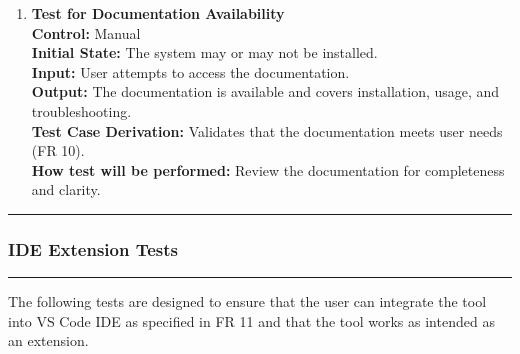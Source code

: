 \documentclass[12pt, titlepage]{article}
\newcommand{\colorrule}{\textcolor{BlueViolet}{\rule{\linewidth}{2pt}}}
\begin{document}
\begin{enumerate}[label={\bf
    \textcolor{Maroon}{test-FR-DA-\arabic*}}, wide=0pt, font=\itshape]
  \item \textbf{Test for Documentation Availability}\\[2mm]
    \textbf{Control:} Manual\\
    \textbf{Initial State:} The system may or may not be installed.\\
    \textbf{Input:} User attempts to access the documentation.\\
    \textbf{Output:} The documentation is available and covers
    installation, usage, and troubleshooting.\\[2mm]
    \textbf{Test Case Derivation:} Validates that the documentation
    meets user needs (FR 10).\\[2mm]
    \textbf{How test will be performed:} Review the documentation for
    completeness and clarity.
\end{enumerate}

\noindent
\colorrule

\subsubsection{IDE Extension Tests}
\colorrule

\medskip

\noindent
The following tests are designed to ensure that the user can
integrate the tool into VS Code IDE as specified in FR 11 and that
the tool works as intended as an extension.
\end{document}
